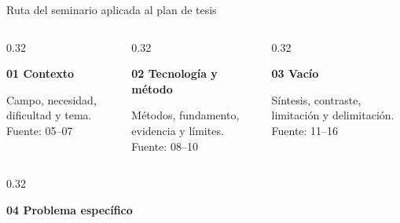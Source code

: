 \documentclass[aspectratio=169,10pt,spanish]{beamer}
\begin{document}
\begin{frame}{Ruta del seminario aplicada al plan de tesis}
    \begin{columns}[T,onlytextwidth]
        \begin{column}{0.32\textwidth}
            \begin{tcolorbox}[height=1.68cm,colback=bpRust!7,colframe=bpRust,arc=1.2mm,valign=center]
                \scriptsize\textbf{\color{bpRust}01 \quad Contexto}\\[1mm]
                \raggedright\tiny Campo, necesidad, dificultad y tema.\\[1mm]
                \tiny Fuente: 05--07
            \end{tcolorbox}
        \end{column}
        \begin{column}{0.32\textwidth}
            \begin{tcolorbox}[height=1.68cm,colback=bpGold!9,colframe=bpGold!90!black,arc=1.2mm,valign=center]
                \scriptsize\textbf{\color{bpGold!80!black}02 \quad Tecnología y método}\\[1mm]
                \raggedright\tiny Métodos, fundamento, evidencia y límites.\\[1mm]
                \tiny Fuente: 08--10
            \end{tcolorbox}
        \end{column}
        \begin{column}{0.32\textwidth}
            \begin{tcolorbox}[height=1.68cm,colback=bpBlue!7,colframe=bpBlue,arc=1.2mm,valign=center]
                \scriptsize\textbf{\color{bpBlue}03 \quad Vacío}\\[1mm]
                \raggedright\tiny Síntesis, contraste, limitación y delimitación.\\[1mm]
                \tiny Fuente: 11--16
            \end{tcolorbox}
        \end{column}
    \end{columns}
    \vspace{0.12cm}
    \begin{columns}[T,onlytextwidth]
        \begin{column}{0.32\textwidth}
            \begin{tcolorbox}[height=1.68cm,colback=bpRust!7,colframe=bpRust,arc=1.2mm,valign=center]
                \scriptsize\textbf{\color{bpRust}04 \quad Problema específico}\\[1mm]

\end{tcolorbox}
\end{column}
\end{columns}
\end{frame}
\end{document}
